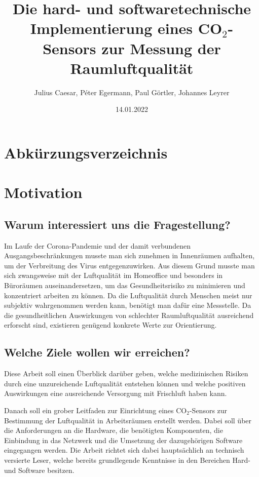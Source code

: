 \documentclass[a4paper,
    11pt,
    headings=small,
    ngerman,
    listof=totoc,
    numbers=noenddot]{scrreprt}[2021/11/13]
\title{Die hard- und softwaretechnische Implementierung eines CO$_2$-Sensors zur Messung der Raumluftqualität}
\author{Julius Caesar, Péter Egermann, Paul Görtler, Johannes Leyrer}
\date{14.01.2022}
\begin{document}
\maketitle

\newpage

\tableofcontents

\newpage

\chapter*{Abkürzungsverzeichnis}

\begin{acronym}[API]
\end{acronym}

\newpage


\chapter{Motivation}

\section{Warum interessiert uns die Fragestellung?}

Im Laufe der Corona-Pandemie und der damit verbundenen Ausgangsbeschränkungen musste man sich zunehmen in Innenräumen aufhalten, um der Verbreitung des Virus entgegenzuwirken. Aus diesem Grund musste man sich zwangsweise mit der Luftqualität im Homeoffice und besonders in Büroräumen auseinandersetzen, um das Gesundheitsrisiko zu minimieren und konzentriert arbeiten zu können. Da die Luftqualität durch Menschen meist nur subjektiv wahrgenommen werden kann, benötigt man dafür eine Messstelle. Da die gesundheitlichen Auswirkungen von schlechter Raumluftqualität ausreichend erforscht sind, existieren genügend konkrete Werte zur Orientierung.

\section{Welche Ziele wollen wir erreichen?}

Diese Arbeit soll einen Überblick darüber geben, welche medizinischen Risiken durch eine unzureichende Luftqualität entstehen können und welche positiven Auswirkungen eine ausreichende Versorgung mit Frischluft haben kann.

Danach soll ein grober Leitfaden zur Einrichtung eines CO$_2$-Sensors zur Bestimmung der Luftqualität in Arbeitsräumen erstellt werden. Dabei soll über die Anforderungen an die Hardware, die benötigten Komponenten, die Einbindung in das Netzwerk und die Umsetzung der dazugehörigen Software eingegangen werden. Die Arbeit richtet sich dabei hauptsächlich an technisch versierte Leser, welche bereits grundlegende Kenntnisse in den Bereichen Hard- und Software besitzen.
\end{document}
